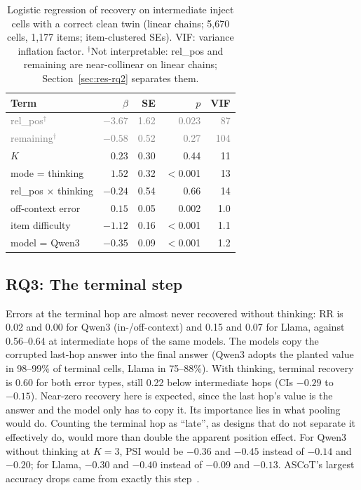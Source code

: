 \documentclass[conference]{IEEEtran}
\newcommand{\RR}{\mathrm{RR}}
\newcommand{\PSI}{\mathrm{PSI}}
\begin{document}
\begin{table}[t]
\centering
\caption{Logistic regression of recovery on intermediate inject cells with a correct clean twin (linear chains; 5{,}670 cells, 1{,}177 items; item-clustered SEs). VIF: variance inflation factor. $^\dagger$Not interpretable: rel\_pos and remaining are near-collinear on linear chains; Section~\ref{sec:res-rq2} separates them.}
\label{tab:logit}
\small
\begin{tabular}{lrrrr}
\toprule
Term & $\beta$ & SE & $p$ & VIF \\
\midrule
\textcolor{gray}{rel\_pos$^\dagger$} & \textcolor{gray}{$-3.67$} & \textcolor{gray}{1.62} & \textcolor{gray}{0.023} & \textcolor{gray}{87} \\
\textcolor{gray}{remaining$^\dagger$} & \textcolor{gray}{$-0.58$} & \textcolor{gray}{0.52} & \textcolor{gray}{0.27} & \textcolor{gray}{104} \\
$K$ & $0.23$ & 0.30 & 0.44 & 11 \\
mode = thinking & $1.52$ & 0.32 & $<$0.001 & 13 \\
rel\_pos $\times$ thinking & $-0.24$ & 0.54 & 0.66 & 14 \\
off-context error & $0.15$ & 0.05 & 0.002 & 1.0 \\
item difficulty & $-1.12$ & 0.16 & $<$0.001 & 1.1 \\
model = Qwen3 & $-0.35$ & 0.09 & $<$0.001 & 1.2 \\
\bottomrule
\end{tabular}
\end{table}

\subsection{RQ3: The terminal step}
Errors at the terminal hop are almost never recovered without thinking: $\RR$ is 0.02 and 0.00 for Qwen3 (in-/off-context) and 0.15 and 0.07 for Llama, against 0.56--0.64 at intermediate hops of the same models. The models copy the corrupted last-hop answer into the final answer (Qwen3 adopts the planted value in 98--99\% of terminal cells, Llama in 75--88\%). With thinking, terminal recovery is 0.60 for both error types, still 0.22 below intermediate hops (CIs $-0.29$ to $-0.15$). Near-zero recovery here is expected, since the last hop's value is the answer and the model only has to copy it. Its importance lies in what pooling would do. Counting the terminal hop as ``late'', as designs that do not separate it effectively do, would more than double the apparent position effect. For Qwen3 without thinking at $K{=}3$, $\PSI$ would be $-0.36$ and $-0.45$ instead of $-0.14$ and $-0.20$; for Llama, $-0.30$ and $-0.40$ instead of $-0.09$ and $-0.13$. ASCoT's largest accuracy drops came from exactly this step~\cite{ascot}.
\end{document}
